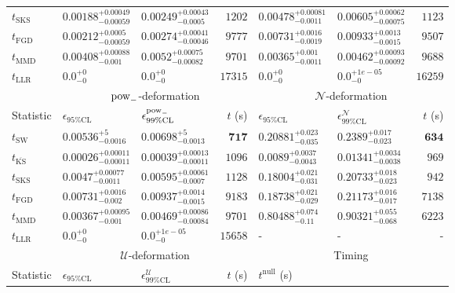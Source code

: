 \begin{tabular}{l|llr|llr}
	$t_{\mathrm{SKS}}$ & $0.00188_{-0.00059}^{+0.00049}$ & $0.00249_{-0.0005}^{+0.00043}$ & $1202$ & $0.00478_{-0.0011}^{+0.00081}$ & $0.00605_{-0.00075}^{+0.00062}$ & $1123$ \\
	$t_{\mathrm{FGD}}$ & $0.00212_{-0.00059}^{+0.0005}$ & $0.00274_{-0.00046}^{+0.00041}$ & $9777$ & $0.00731_{-0.0019}^{+0.0016}$ & $0.00933_{-0.0015}^{+0.0013}$ & $9507$ \\
	$t_{\mathrm{MMD}}$ & $0.00408_{-0.001}^{+0.00088}$ & $0.0052_{-0.00082}^{+0.00075}$ & $9701$ & $0.00365_{-0.0011}^{+0.001}$ & $0.00462_{-0.00092}^{+0.00093}$ & $9688$ \\
	$t_{\mathrm{LLR}}$ & $0.0_{-0}^{+0}$ & $0.0_{-0}^{+0}$ & $17315$ & $0.0_{-0}^{+0}$ & $0.0_{-0}^{+1e-05}$ & $16259$ \\
	\toprule
	\multicolumn{1}{c}{} & \multicolumn{3}{c}{$\rm{pow}_{-}$-deformation} & \multicolumn{3}{c}{$\mathcal{N}$-deformation} \\
	Statistic & $\epsilon_{95\%\mathrm{CL}}$ & $\epsilon^  {\rm{pow}_{-}}_{99\%\mathrm{CL}}$ & $t$ (s) & $\epsilon_{95\%\mathrm{CL}}$ & $\epsilon^    {\mathcal{N}}_{99\%\mathrm{CL}}$ & $t$ (s) \\
	\midrule
	$t_{\mathrm{SW}}$ & $0.00536_{-0.0016}^{+5}$ & $0.00698_{-0.0013}^{+5}$ & ${\mathbf{717}}$ & $0.20881_{-0.035}^{+0.023}$ & $0.2389_{-0.023}^{+0.017}$ & ${\mathbf{634}}$ \\
	$t_{\overline{\mathrm{KS}}}$ & ${\mathbf{0.00026_{-0.00011}^{+0.00011}}}$ & ${\mathbf{0.00039_{-0.00011}^{+0.00013}}}$ & $1096$ & ${\mathbf{0.0089_{-0.0043}^{+0.0037}}}$ & ${\mathbf{0.01341_{-0.0038}^{+0.0034}}}$ & $969$ \\
	$t_{\mathrm{SKS}}$ & $0.0047_{-0.0011}^{+0.00077}$ & $0.00595_{-0.0007}^{+0.00061}$ & $1128$ & $0.18004_{-0.031}^{+0.021}$ & $0.20733_{-0.023}^{+0.018}$ & $942$ \\
	$t_{\mathrm{FGD}}$ & $0.00731_{-0.002}^{+0.0016}$ & $0.00937_{-0.0015}^{+0.0014}$ & $9183$ & $0.18738_{-0.029}^{+0.021}$ & $0.21173_{-0.017}^{+0.016}$ & $7138$ \\
	$t_{\mathrm{MMD}}$ & $0.00367_{-0.001}^{+0.00095}$ & $0.00469_{-0.00084}^{+0.00086}$ & $9701$ & $0.80488_{-0.11}^{+0.074}$ & $0.90321_{-0.068}^{+0.055}$ & $6223$ \\
	$t_{\mathrm{LLR}}$ & $0.0_{-0}^{+0}$ & $0.0_{-0}^{+1e-05}$ & $15658$ & - & - & - \\
	\toprule
	\multicolumn{1}{c}{} & \multicolumn{3}{c}{$\mathcal{U}$-deformation} & \multicolumn{3}{c}{Timing} \\
	Statistic & $\epsilon_{95\%\mathrm{CL}}$ & $\epsilon^    {\mathcal{U}}_{99\%\mathrm{CL}}$ & $t$ (s) & $t^{\mathrm{null}}$ (s) \\

\end{tabular}
